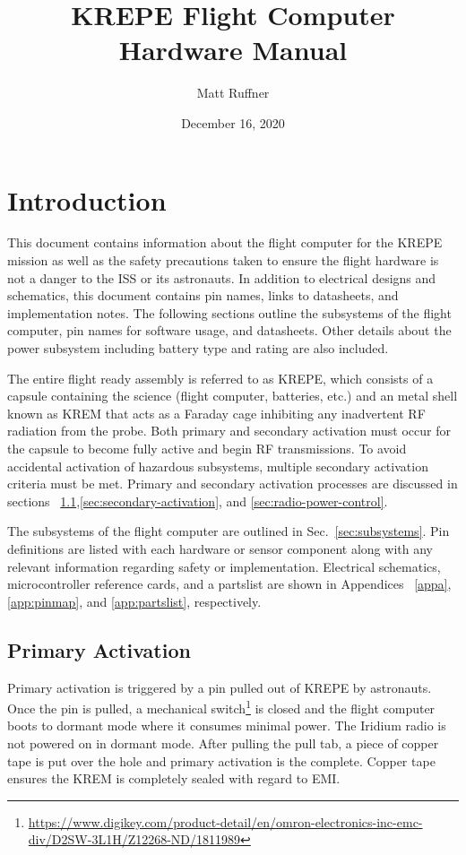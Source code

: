 \documentclass{article}
\title{KREPE Flight Computer Hardware Manual}
\author{Matt Ruffner}
\date{December 16, 2020}
\begin{document}
\maketitle
\tableofcontents
\listoffigures
\listoftables
\newpage


\section{Introduction}

This document contains information about the flight computer for the KREPE mission as well as the safety precautions taken to ensure the flight hardware is not a danger to the ISS or its astronauts. In addition to electrical designs and schematics, this document contains pin names, links to datasheets, and implementation notes. The following sections outline the subsystems of the flight computer, pin names for software usage, and datasheets. Other details about the power subsystem including battery type and rating are also included. 

The entire flight ready assembly is referred to as KREPE, which consists of a capsule containing the science (flight computer, batteries, etc.) and an metal shell known as KREM that acts as a Faraday cage inhibiting any inadvertent RF radiation from the probe. Both primary and secondary activation must occur for the capsule to become fully active and begin RF transmissions. To avoid accidental activation of hazardous subsystems, multiple secondary activation criteria must be met. Primary and secondary activation processes are discussed in sections ~\ref{sec:primary-activation},\ref{sec:secondary-activation}, and \ref{sec:radio-power-control}.

The subsystems of the flight computer are outlined in Sec.~\ref{sec:subsystems}. Pin definitions are listed with each hardware or sensor component along with any relevant information regarding safety or implementation. Electrical schematics, microcontroller reference cards, and a partslist are shown in  Appendices ~\ref{appa}, \ref{app:pinmap}, and \ref{app:partslist}, respectively.


\subsection{Primary Activation}
\label{sec:primary-activation}
Primary activation is triggered by a pin pulled out of KREPE by astronauts. Once the pin is pulled, a mechanical switch\footnote{\url{https://www.digikey.com/product-detail/en/omron-electronics-inc-emc-div/D2SW-3L1H/Z12268-ND/1811989}} is closed and the flight computer boots to dormant mode where it consumes minimal power. The Iridium radio is not powered on in dormant mode. After pulling the pull tab, a piece of copper tape is put over the hole and primary activation is the complete. Copper tape ensures the KREM is completely sealed with regard to EMI. 
\end{document}
